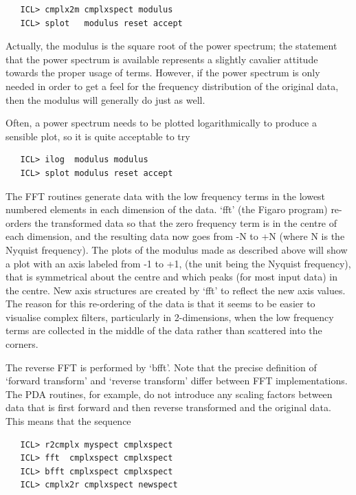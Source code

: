 \documentclass[11pt,twoside]{article}
\begin{document}
\begin{verbatim}
   ICL> cmplx2m cmplxspect modulus
   ICL> splot   modulus reset accept
\end{verbatim}

   Actually, the modulus is the square root of the power spectrum; the
   statement that the power spectrum is available represents a slightly
   cavalier attitude towards the proper usage of terms.  However, if the
   power spectrum is only needed in order to get a feel for the
   frequency distribution of the original data, then the modulus will
   generally do just as well.

   Often, a power spectrum needs to be plotted logarithmically to
   produce a sensible plot, so it is quite acceptable to try

\begin{verbatim}
   ICL> ilog  modulus modulus
   ICL> splot modulus reset accept
\end{verbatim}

   The FFT routines generate data with the low frequency terms in
   the lowest numbered elements in each dimension of the data. `fft'
   (the Figaro program) re-orders the transformed data so that the zero
   frequency term is in the centre of each dimension, and the resulting
   data now goes from -N to +N (where N is the Nyquist frequency).  The
   plots of the modulus made as described above will show a plot with an
   axis labeled from -1 to +1, (the unit being the Nyquist frequency),
   that is symmetrical about the centre and which peaks (for most input
   data) in the centre.  New axis structures are created by `fft' to
   reflect the new axis values.  The reason for this re-ordering of the
   data is that it seems to be easier to visualise complex filters,
   particularly in 2-dimensions, when the low frequency terms are
   collected in the middle of the data rather than scattered into the
   corners.

   The reverse FFT is performed by `bfft'.  Note that the precise
   definition  of `forward transform' and `reverse transform' differ
   between FFT implementations.  The PDA routines, for example, do not
   introduce any scaling factors between data that is first forward and
   then reverse transformed and the original data.  This means that the
   sequence

\begin{verbatim}
   ICL> r2cmplx myspect cmplxspect
   ICL> fft  cmplxspect cmplxspect
   ICL> bfft cmplxspect cmplxspect
   ICL> cmplx2r cmplxspect newspect
\end{verbatim}
\end{document}
